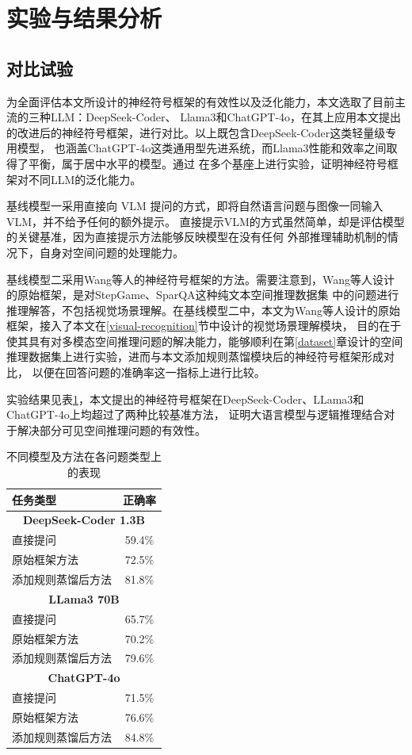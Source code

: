 \section{实验与结果分析}
\subsection{对比试验}
为全面评估本文所设计的神经符号框架的有效性以及泛化能力，本文选取了目前主流的三种LLM：DeepSeek-Coder、
Llama3和ChatGPT-4o，在其上应用本文提出的改进后的神经符号框架，进行对比。以上既包含DeepSeek-Coder这类轻量级专用模型，
也涵盖ChatGPT-4o这类通用型先进系统，而Llama3性能和效率之间取得了平衡，属于居中水平的模型。通过
在多个基座上进行实验，证明神经符号框架对不同LLM的泛化能力。

基线模型一采用直接向 VLM 提问的方式，即将自然语言问题与图像一同输入 VLM，并不给予任何的额外提示。
直接提示VLM的方式虽然简单，却是评估模型的关键基准，因为直接提示方法能够反映模型在没有任何
外部推理辅助机制的情况下，自身对空间问题的处理能力。

基线模型二采用Wang等人\cite{wang2024dspy}的神经符号框架的方法。需要注意到，Wang等人设计的原始框架，是对StepGame、SparQA这种纯文本空间推理数据集
中的问题进行推理解答，不包括视觉场景理解。在基线模型二中，本文为Wang等人设计的原始框架，接入了本文在\ref{visual-recognition}节中设计的视觉场景理解模块，
目的在于使其具有对多模态空间推理问题的解决能力，能够顺利在第\ref{dataset}章设计的空间推理数据集上进行实验，进而与本文添加规则蒸馏模块后的神经符号框架形成对比，
以便在回答问题的准确率这一指标上进行比较。

实验结果见表\ref{tab:overall_comparison}，本文提出的神经符号框架在DeepSeek-Coder、LLama3和ChatGPT-4o上均超过了两种比较基准方法，
证明大语言模型与逻辑推理结合对于解决部分可见空间推理问题的有效性。

\begin{table}[h]
    \centering
    \begin{tabular}{lc}
        \toprule
        \textbf{任务类型} & \textbf{正确率} \\
        \midrule
        \multicolumn{2}{c}{\textbf{DeepSeek-Coder 1.3B}} \\
        直接提问 & 59.4\% \\
        原始框架方法 & 72.5\% \\
        添加规则蒸馏后方法 & 81.8\% \\
        \midrule
        \multicolumn{2}{c}{\textbf{LLama3 70B}} \\
        直接提问 & 65.7\% \\
        原始框架方法 & 70.2\% \\
        添加规则蒸馏后方法 & 79.6\% \\
        \midrule
        \multicolumn{2}{c}{\textbf{ChatGPT-4o}} \\
        直接提问 & 71.5\% \\
        原始框架方法 & 76.6\% \\
        添加规则蒸馏后方法 & 84.8\% \\
        \bottomrule
    \end{tabular}
    \caption{不同模型及方法在各问题类型上的表现}
    \label{tab:overall_comparison}
\end{table}
